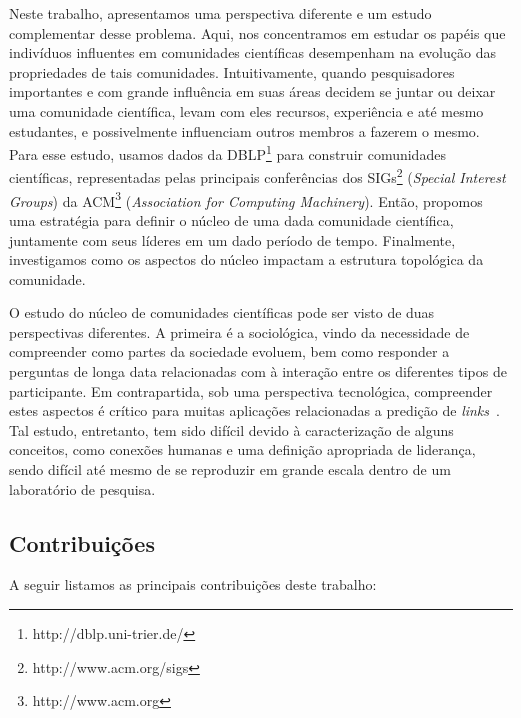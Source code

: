 \documentclass[12pt]{article}
\begin{document}
Neste trabalho, apresentamos uma perspectiva diferente e um estudo complementar desse problema. 
Aqui, nos concentramos em estudar os papéis que indivíduos influentes em comunidades científicas
desempenham na evolução das propriedades de tais comunidades. Intuitivamente, quando pesquisadores 
importantes e com grande influência em suas áreas decidem se juntar ou deixar uma comunidade científica, levam com eles recursos,
experiência e até mesmo estudantes, e possivelmente influenciam outros membros a fazerem o mesmo. Para esse 
estudo, usamos dados da DBLP\footnote{http://dblp.uni-trier.de/} para construir 
comunidades científicas, representadas pelas principais conferências
dos SIGs\footnote{http://www.acm.org/sigs} (\textit{Special Interest Groups}) da ACM\footnote{http://www.acm.org}
(\textit{Association for Computing Machinery}). Então, propomos uma estratégia para definir o 
núcleo de uma dada comunidade científica, juntamente com seus líderes em um dado período de 
tempo. Finalmente, investigamos como os aspectos do núcleo impactam a estrutura topológica da comunidade.

O estudo do núcleo de comunidades científicas pode ser visto de duas perspectivas diferentes. A 
primeira é a sociológica, vindo da necessidade de compreender como partes da sociedade evoluem, 
bem como responder a perguntas de longa data relacionadas com à interação entre os diferentes 
tipos de participante. Em contrapartida, sob uma perspectiva tecnológica, compreender estes 
aspectos é crítico para muitas aplicações relacionadas a predição de \textit{links}~\cite{Getoor2005}. Tal estudo, entretanto, 
tem sido difícil devido à caracterização de alguns conceitos, como conexões humanas e uma definição apropriada 
de liderança, sendo difícil até mesmo de se reproduzir em grande escala dentro de um laboratório de pesquisa.

\subsection{Contribuições}

A seguir listamos as principais contribuições deste trabalho:
\end{document}
